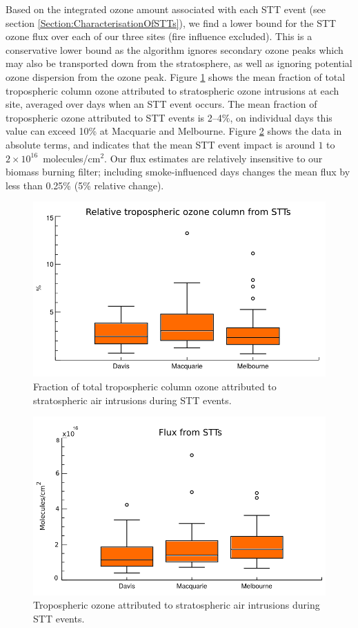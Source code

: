 \documentclass{article}
\begin{document}
  Based on the integrated ozone amount associated with each STT event (see section \ref{Section:CharacterisationOfSTTs}), we find a lower bound for the STT ozone flux over each of our three sites (fire influence excluded).
  This is a conservative lower bound as the algorithm ignores secondary ozone peaks which may also be transported down from the stratosphere, as well as ignoring potential ozone dispersion from the ozone peak.
  Figure \ref{fig:fluxsummary} shows the mean fraction of total tropospheric column ozone attributed to stratospheric ozone intrusions at each site, averaged over days when an STT event occurs.
  The mean fraction of tropospheric ozone attributed to STT events is 2--4\%, on individual days this value can exceed 10\% at Macquarie and Melbourne.
  Figure \ref{fig:fluxsummaryabs} shows the data in absolute terms, and indicates that the mean STT event impact is around $1$ to $2 \times 10^{16}$~molecules/cm$^2$.
  Our flux estimates are relatively insensitive to our biomass burning filter; including smoke-influenced days changes the mean flux by less than 0.25\% (5\% relative change).
  
  \begin{figure}[!htbp]
    \begin{center}
    \includegraphics[width=0.8\columnwidth]{figures/flux_relative.png}
    \caption{Fraction of total tropospheric column ozone attributed to stratospheric air intrusions during STT events.}
    \label{fig:fluxsummary}
    \end{center}
  \end{figure}
  \begin{figure}[!htbp]
    \begin{center}
    \includegraphics[width=0.8\columnwidth]{figures/flux_absolute.png}
    \caption{Tropospheric ozone attributed to stratospheric air intrusions during STT events.}
    \label{fig:fluxsummaryabs}
    \end{center}
  \end{figure}
  
\end{document}
